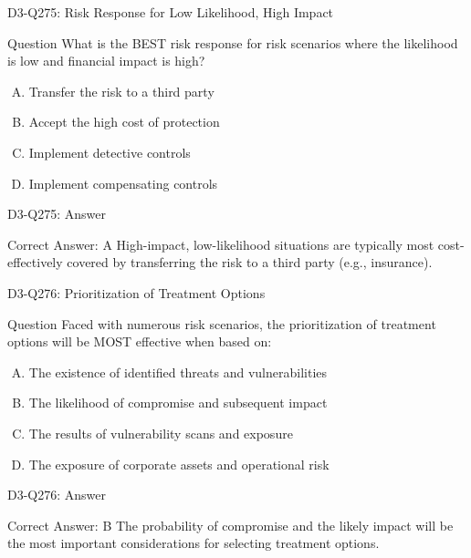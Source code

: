 \documentclass{beamer}
\begin{document}
	\begin{frame}{D3-Q275: Risk Response for Low Likelihood, High Impact}
		\begin{block}{Question}
			What is the BEST risk response for risk scenarios where the likelihood is low and financial impact is high?
		\end{block}
		\begin{enumerate}[(A)]
			\item Transfer the risk to a third party
			\item Accept the high cost of protection
			\item Implement detective controls
			\item Implement compensating controls
		\end{enumerate}
	\end{frame}
	\begin{frame}{D3-Q275: Answer}
		\begin{block}{Correct Answer: A}
			High-impact, low-likelihood situations are typically most cost-effectively covered by transferring the risk to a third party (e.g., insurance).
		\end{block}
	\end{frame}
	
	\begin{frame}{D3-Q276: Prioritization of Treatment Options}
		\begin{block}{Question}
			Faced with numerous risk scenarios, the prioritization of treatment options will be MOST effective when based on:
		\end{block}
		\begin{enumerate}[(A)]
			\item The existence of identified threats and vulnerabilities
			\item The likelihood of compromise and subsequent impact
			\item The results of vulnerability scans and exposure
			\item The exposure of corporate assets and operational risk
		\end{enumerate}
	\end{frame}
	\begin{frame}{D3-Q276: Answer}
		\begin{block}{Correct Answer: B}
			The probability of compromise and the likely impact will be the most important considerations for selecting treatment options.
		\end{block}
	\end{frame}
	
\end{document}
